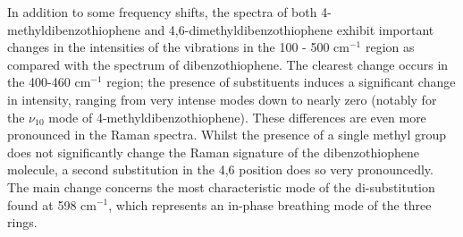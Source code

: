 	In addition to some frequency shifts, the spectra of both 4-methyldibenzothiophene and 4,6-dimethyldibenzothiophene exhibit important changes in the intensities of the vibrations in the 100 - 500 cm$^{-1}$ region as compared with the spectrum of dibenzothiophene. The clearest change occurs in the 400-460 cm$^{-1}$ region; the presence of substituents induces a significant change in intensity, ranging from very intense modes down to nearly zero (notably for the $\nu_{10}$ mode of 4-methyldibenzothiophene). These differences are even more pronounced in the Raman spectra. Whilst the presence of a single methyl group does not significantly change the Raman signature of the dibenzothiophene molecule, a second substitution in the 4,6 position does so very pronouncedly. The main change concerns the most characteristic mode of the di-substitution found at 598 cm$^{-1}$, which represents an in-phase breathing mode of the three rings.
	
